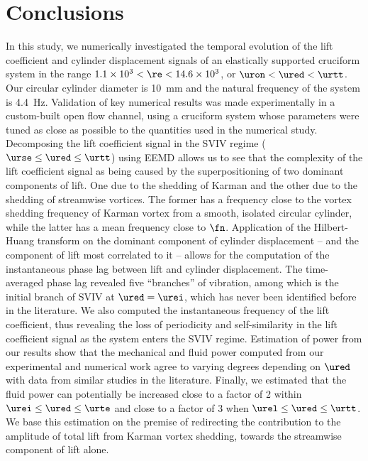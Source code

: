 \documentclass[a4paper,fleqn]{cas-sc}
\begin{document}
\section{Conclusions} \label{sec:conclusions}
In this study, we numerically investigated the temporal evolution of the lift coefficient and cylinder displacement signals of an elastically supported cruciform system in the range $1.1 \times 10^{3} < \re < 14.6 \times 10^{3}$, or $\uron < \ured < \urtt$. Our circular cylinder diameter is \SI{10}{\milli\metre} and the natural frequency of the system is \SI{4.4}{\hertz}. Validation of key numerical results was made experimentally in a custom-built open flow channel, using a cruciform system whose parameters were tuned as close as possible to the quantities used in the numerical study. Decomposing the lift coefficient signal in the SVIV regime ($\urse \leq \ured \leq \urtt$) using EEMD allows us to see that the complexity of the lift coefficient signal as being caused by the superpositioning of two dominant components of lift. One due to the shedding of Karman and the other due to the shedding of streamwise vortices. The former has a frequency close to the vortex shedding frequency of Karman vortex from a smooth, isolated circular cylinder, while the latter has a mean frequency close to $\fn$. Application of the Hilbert-Huang transform on the dominant component of cylinder displacement -- and the component of lift most correlated to it -- allows for the computation of the instantaneous phase lag between lift and cylinder displacement. The time-averaged phase lag revealed five ``branches'' of vibration, among which is the initial branch of SVIV at $\ured = \urei$, which has never been identified before in the literature. We also computed the instantaneous frequency of the lift coefficient, thus revealing the loss of periodicity and self-similarity in the lift coefficient signal as the system enters the SVIV regime. Estimation of power from our results show that the \rms{} mechanical and fluid power computed from our experimental and numerical work agree to varying degrees depending on $\ured$ with data from similar studies in the literature. Finally, we estimated that the \rms{} fluid power can potentially be increased close to a factor of 2 within $\urei \leq \ured \leq \urte$ and close to a factor of 3 when $\urel \leq \ured \leq \urtt$. We base this estimation on the premise of redirecting the contribution to the \rms{} amplitude of total lift from Karman vortex shedding, towards the streamwise component of lift alone.
\end{document}
